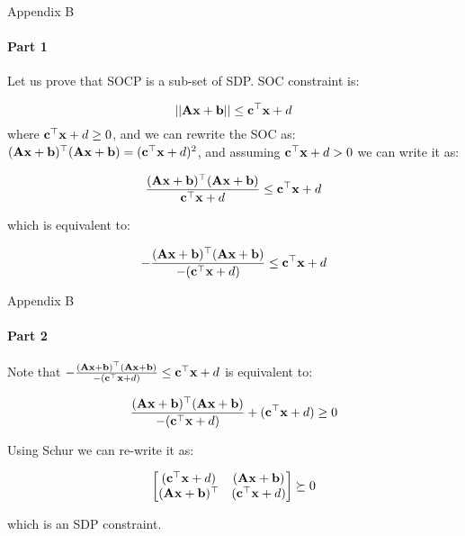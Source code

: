 \documentclass{beamer}
\begin{document}
\begin{frame}{Appendix B}
	\framesubtitle{Part 1}
	\begin{flushleft}
		
		Let us prove that SOCP is a sub-set of SDP. SOC constraint is:
		
		\begin{equation}
			||\mathbf{A}\mathbf{x} + \mathbf{b}|| \leq \mathbf{c}^\top \mathbf{x} + d
		\end{equation}
	where $\mathbf{c}^\top \mathbf{x} + d \geq 0$, and we can rewrite the SOC as: $(\mathbf{A}\mathbf{x} + \mathbf{b})^\top (\mathbf{A}\mathbf{x} + \mathbf{b}) = (\mathbf{c}^\top \mathbf{x} + d)^2$, and assuming $\mathbf{c}^\top \mathbf{x} + d > 0$ we can write it as:
	
	\begin{equation}
		\frac{(\mathbf{A}\mathbf{x} + \mathbf{b})^\top (\mathbf{A}\mathbf{x} + \mathbf{b})}{\mathbf{c}^\top \mathbf{x} + d} \leq \mathbf{c}^\top \mathbf{x} + d
	\end{equation}
	
	which is equivalent to:
	
	\begin{equation}
		-\frac{(\mathbf{A}\mathbf{x} + \mathbf{b})^\top (\mathbf{A}\mathbf{x} + \mathbf{b})}{-(\mathbf{c}^\top \mathbf{x} + d)} \leq \mathbf{c}^\top \mathbf{x} + d
	\end{equation}
		
	\end{flushleft}
\end{frame}





\begin{frame}{Appendix B}
	\framesubtitle{Part 2}
	\begin{flushleft}
		
		Note that $-\frac{(\mathbf{A}\mathbf{x} + \mathbf{b})^\top (\mathbf{A}\mathbf{x} + \mathbf{b})}{-(\mathbf{c}^\top \mathbf{x} + d)} \leq \mathbf{c}^\top \mathbf{x} + d$ is equivalent to:
		
		\begin{equation}
			\frac{(\mathbf{A}\mathbf{x} + \mathbf{b})^\top (\mathbf{A}\mathbf{x} + \mathbf{b})}{-(\mathbf{c}^\top \mathbf{x} + d)} + (\mathbf{c}^\top \mathbf{x} + d) \geq 0
		\end{equation}
		
		Using Schur we can re-write it as:
		
		\begin{equation}
			\begin{bmatrix}
				(\mathbf{c}^\top \mathbf{x} + d) & (\mathbf{A}\mathbf{x} + \mathbf{b}) \\
				(\mathbf{A}\mathbf{x} + \mathbf{b})^\top & (\mathbf{c}^\top \mathbf{x} + d)
			\end{bmatrix} \succeq 0
		\end{equation}
		
		which is an SDP constraint.
		
	\end{flushleft}
\end{frame}
\end{document}
